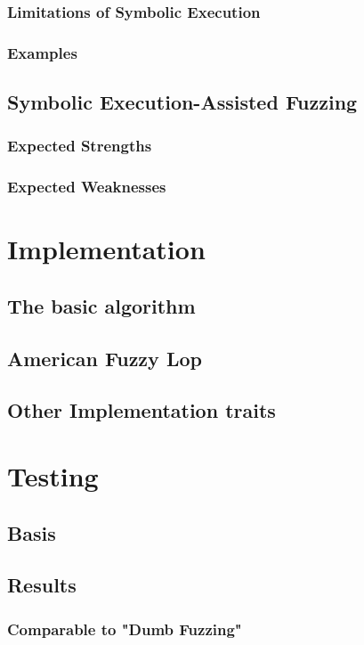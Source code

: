 \documentclass[a4paper]{article}
\begin{document}
\subsubsection*{Limitations of Symbolic Execution}
\subsubsection*{Examples}

\subsection{Symbolic Execution-Assisted Fuzzing}
\subsubsection*{Expected Strengths}
\subsubsection*{Expected Weaknesses}

\section{Implementation}
\subsection{The basic algorithm}
\subsection{American Fuzzy Lop}
\subsection{Other Implementation traits}

\section{Testing}
\subsection{Basis}
\subsection{Results}
\subsubsection*{Comparable to "Dumb Fuzzing"}
\end{document}
